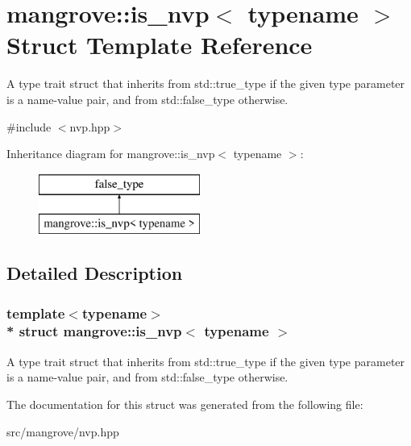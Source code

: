 \hypertarget{structmangrove_1_1is__nvp}{}\section{mangrove\+:\+:is\+\_\+nvp$<$ typename $>$ Struct Template Reference}
\label{structmangrove_1_1is__nvp}


A type trait struct that inherits from std\+::true\+\_\+type if the given type parameter is a name-\/value pair, and from std\+::false\+\_\+type otherwise.  




{\ttfamily \#include $<$nvp.\+hpp$>$}

Inheritance diagram for mangrove\+:\+:is\+\_\+nvp$<$ typename $>$\+:\begin{figure}[H]
\begin{center}
\leavevmode
\includegraphics[height=2.000000cm]{structmangrove_1_1is__nvp}
\end{center}
\end{figure}


\subsection{Detailed Description}
\subsubsection*{template$<$typename$>$\\*
struct mangrove\+::is\+\_\+nvp$<$ typename $>$}

A type trait struct that inherits from std\+::true\+\_\+type if the given type parameter is a name-\/value pair, and from std\+::false\+\_\+type otherwise. 

The documentation for this struct was generated from the following file\+:\begin{DoxyCompactItemize}
\item 
src/mangrove/nvp.\+hpp\end{DoxyCompactItemize}

